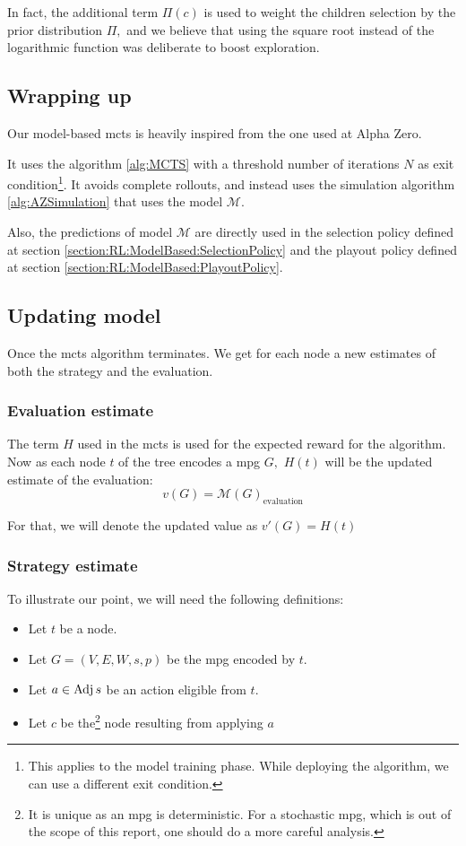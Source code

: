 In fact, the additional term $\Pi(c)$ is used to weight the children selection by the prior distribution $\Pi,$ and we believe that using the square root instead of the logarithmic function was deliberate to boost exploration.

\subsection{Wrapping up}
Our model-based \acrshort{mcts} is heavily inspired from the one used at Alpha Zero.

It uses the algorithm \ref{alg:MCTS} with a threshold number of iterations $N$ as exit condition\footnote{This applies to the model training phase. While deploying the algorithm, we can use a different exit condition.}. It avoids complete rollouts, and instead uses the simulation algorithm \ref{alg:AZSimulation} that uses the model $\mathcal{M}$.

Also, the predictions of model $\mathcal{M}$ are directly used in the selection policy defined at section \ref{section:RL:ModelBased:SelectionPolicy} and the playout policy defined at section \ref{section:RL:ModelBased:PlayoutPolicy}.
\subsection{Updating model}
Once the \acrshort{mcts} algorithm terminates. We get for each node a new estimates of both the strategy and the evaluation.
\subsubsection{Evaluation estimate}
The term $H$ used in the \acrshort{mcts} is used for the expected reward for the algorithm. Now as each node $t$ of the tree encodes a \acrshort{mpg} $G,$ $H(t)$ will be the updated estimate of the evaluation:
\begin{equation*}
	v(G)=\mathcal{M}(G)_{\text{evaluation}}
\end{equation*}

For that, we will denote the updated value as $v'(G)=H(t)$

\subsubsection{Strategy estimate}
To illustrate our point, we will need the following definitions:
\begin{itemize}
	\item Let $t$ be a node.
	\item Let $G=(V,E,W,s,p)$ be the \acrshort{mpg} encoded by $t.$
	\item Let $a\in \operatorname{Adj} s$ be an action eligible from $t.$
	\item Let $c$ be the\footnote{It is unique as an \acrshort{mpg} is deterministic. For a stochastic \acrshort{mpg}, which is out of the scope of this report, one should do a more careful analysis.} node resulting from applying $a$
\end{itemize}

